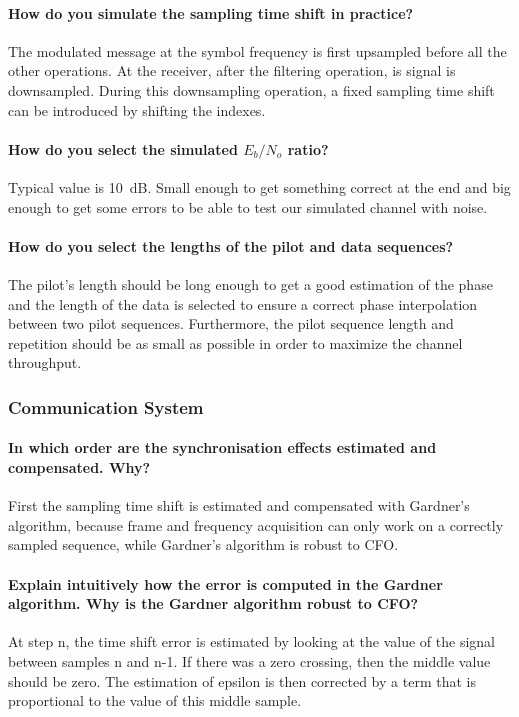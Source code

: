 \paragraph{How do you simulate the sampling time shift in practice?}The modulated message at the symbol frequency is first upsampled before all the other operations.
At the receiver, after the filtering operation, is signal is downsampled.
During this downsampling operation, a fixed sampling time shift can be introduced by shifting the indexes.

\paragraph{How do you select the simulated $E_{b}/N_{o}$ ratio?} Typical value is \SI{10}{\deci\bel}. Small enough to get something correct at the end and big enough to get some errors to be able to test our simulated channel with noise.

\paragraph{How do you select the lengths of the pilot and data sequences?} The pilot's length should be long enough to get a good estimation of the phase and the length of the data is selected to ensure a correct phase interpolation between two pilot sequences. Furthermore, the pilot sequence length and repetition should be as small as possible in order to maximize the channel throughput.

\subsubsection{Communication System}


\paragraph{In which order are the synchronisation effects estimated and compensated. Why?} First the sampling time shift is estimated and compensated with Gardner's algorithm, because frame and frequency acquisition can only work on a correctly sampled sequence, while Gardner's algorithm is robust to CFO.


\paragraph{Explain intuitively how the error is computed in the Gardner algorithm. Why is the
Gardner algorithm robust to CFO?} At step n, the time shift error is estimated by looking at the value of the signal between samples n and n-1. If there was a zero crossing, then the middle value should be zero. The estimation of epsilon is then corrected by a term that is proportional to the value of this middle sample.

